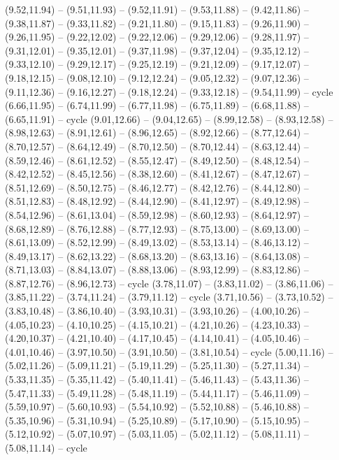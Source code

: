 {  (9.52,11.94) -- (9.51,11.93) -- (9.52,11.91) -- (9.53,11.88) -- (9.42,11.86) -- (9.38,11.87) -- (9.33,11.82) -- (9.21,11.80) -- (9.15,11.83) -- (9.26,11.90) -- (9.26,11.95) -- (9.22,12.02) -- (9.22,12.06) -- (9.29,12.06) -- (9.28,11.97) -- (9.31,12.01) -- (9.35,12.01) -- (9.37,11.98) -- (9.37,12.04) -- (9.35,12.12) -- (9.33,12.10) -- (9.29,12.17) -- (9.25,12.19) -- (9.21,12.09) -- (9.17,12.07) -- (9.18,12.15) -- (9.08,12.10) -- (9.12,12.24) -- (9.05,12.32) -- (9.07,12.36) -- (9.11,12.36) -- (9.16,12.27) -- (9.18,12.24) -- (9.33,12.18) -- (9.54,11.99) -- cycle
  (6.66,11.95) -- (6.74,11.99) -- (6.77,11.98) -- (6.75,11.89) -- (6.68,11.88) -- (6.65,11.91) -- cycle
  (9.01,12.66) -- (9.04,12.65) -- (8.99,12.58) -- (8.93,12.58) -- (8.98,12.63) -- (8.91,12.61) -- (8.96,12.65) -- (8.92,12.66) -- (8.77,12.64) -- (8.70,12.57) -- (8.64,12.49) -- (8.70,12.50) -- (8.70,12.44) -- (8.63,12.44) -- (8.59,12.46) -- (8.61,12.52) -- (8.55,12.47) -- (8.49,12.50) -- (8.48,12.54) -- (8.42,12.52) -- (8.45,12.56) -- (8.38,12.60) -- (8.41,12.67) -- (8.47,12.67) -- (8.51,12.69) -- (8.50,12.75) -- (8.46,12.77) -- (8.42,12.76) -- (8.44,12.80) -- (8.51,12.83) -- (8.48,12.92) -- (8.44,12.90) -- (8.41,12.97) -- (8.49,12.98) -- (8.54,12.96) -- (8.61,13.04) -- (8.59,12.98) -- (8.60,12.93) -- (8.64,12.97) -- (8.68,12.89) -- (8.76,12.88) -- (8.77,12.93) -- (8.75,13.00) -- (8.69,13.00) -- (8.61,13.09) -- (8.52,12.99) -- (8.49,13.02) -- (8.53,13.14) -- (8.46,13.12) -- (8.49,13.17) -- (8.62,13.22) -- (8.68,13.20) -- (8.63,13.16) -- (8.64,13.08) -- (8.71,13.03) -- (8.84,13.07) -- (8.88,13.06) -- (8.93,12.99) -- (8.83,12.86) -- (8.87,12.76) -- (8.96,12.73) -- cycle}
\expandafter\def\csname geo:gebiet:DE-HB\endcsname{
  (3.78,11.07) -- (3.83,11.02) -- (3.86,11.06) -- (3.85,11.22) -- (3.74,11.24) -- (3.79,11.12) -- cycle
  (3.71,10.56) -- (3.73,10.52) -- (3.83,10.48) -- (3.86,10.40) -- (3.93,10.31) -- (3.93,10.26) -- (4.00,10.26) -- (4.05,10.23) -- (4.10,10.25) -- (4.15,10.21) -- (4.21,10.26) -- (4.23,10.33) -- (4.20,10.37) -- (4.21,10.40) -- (4.17,10.45) -- (4.14,10.41) -- (4.05,10.46) -- (4.01,10.46) -- (3.97,10.50) -- (3.91,10.50) -- (3.81,10.54) -- cycle}
\expandafter\def\csname geo:gebiet:DE-HH\endcsname{
  (5.00,11.16) -- (5.02,11.26) -- (5.09,11.21) -- (5.19,11.29) -- (5.25,11.30) -- (5.27,11.34) -- (5.33,11.35) -- (5.35,11.42) -- (5.40,11.41) -- (5.46,11.43) -- (5.43,11.36) -- (5.47,11.33) -- (5.49,11.28) -- (5.48,11.19) -- (5.44,11.17) -- (5.46,11.09) -- (5.59,10.97) -- (5.60,10.93) -- (5.54,10.92) -- (5.52,10.88) -- (5.46,10.88) -- (5.35,10.96) -- (5.31,10.94) -- (5.25,10.89) -- (5.17,10.90) -- (5.15,10.95) -- (5.12,10.92) -- (5.07,10.97) -- (5.03,11.05) -- (5.02,11.12) -- (5.08,11.11) -- (5.08,11.14) -- cycle}
